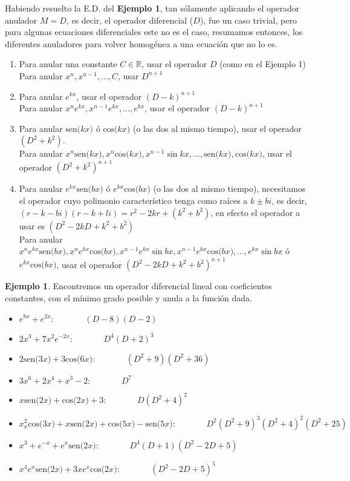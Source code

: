 \documentclass{article}
\newcommand{\eqtab}{\:\:\:\:\:\:\:\:\:\:\:\:\:\:\:\:}
\newcommand{\sen}[1]{\text{sen(} #1 \text{)}}
\renewcommand{\cos}[1]{\text{cos(} #1 \text{)}}
\theoremstyle{definition}
\newtheorem{ejemplo}[ejm]{Ejemplo}
\begin{document}
Habiendo resuelto la E.D. del \textbf{Ejemplo 1}, tan s\'{o}lamente aplicando el operador anulador $M = D$, es decir, el operador diferencial ($D$), fue un caso trivial, pero para algunas ecuaciones diferenciales este no es el caso, resumamos entonces, los diferentes anuladores para volver homog\'{e}nea a una ecuaci\'{o}n que no lo es.

\begin{enumerate}
\item Para anular una constante $C \in \mathbb{R}$, usar el operador $D$ (como en el Ejemplo 1)\\
	Para anular $x^n,x^{n-1}, \dots, C$, usar $D^{n+1}$
\item Para anular $e^{kx}$, usar el operador $(D - k)^{n+1}$\\
	Para anular $x^ne^{kx}, x^{n-1}e^{kx}, \dots, e^{kx}$, usar el operador $(D-k)^{n+1}$
\item Para anular  $\sen{kx}$ \'{o} $\cos{kx}$ (o las dos al mismo tiempo), usar el operador $(D^2 + k^2)$.\\
	Para anular $x^n\sen{kx},x^n\cos{kx},x^{n-1}\sin{kx},\dots,\sen{kx},\cos{kx}$, usar el operador $(D^2 + k^2)^{n+1}$
\item Para anular $e^{kx}\sen{bx}$ \'{o} $e^{kx}\cos{bx}$ (o las dos al mismo tiempo), necesitamos el operador cuyo polimonio caracter\'{i}stico tenga como ra\'{i}ces a $k \pm bi$, es decir, $(r - k - bi)(r - k + li) = r^2 - 2kr + (k^2 + b^2)$, en efecto el operador a usar es $(D^2 - 2kD + k^2 + b^2)$\\
	Para anular $x^ne^{kx}\sen{bx}, x^ne^{kx}\cos{bx},x^{n-1}e^{kx}\sin{bx}, x^{n-1}e^{kx}\cos{bx},\dots,e^{kx}\sin{bx}$ \'{o} $e^{kx}\cos{bx}$, usar el operador $(D^2 - 2kD + k^2 + b^2)^{n+1}$
\end{enumerate}

\begin{ejemplo}
Encontremos un operador diferencial lineal con coeficientes constantes, con el m\'{i}nimo grado posible y anula a la funci\'{o}n dada.

\begin{itemize}
\item $e^{8x} + e^{2x}: \eqtab (D-8)(D-2)$
\item $2x^3 + 7x^2e^{-2x}: \eqtab D^4(D+2)^3$ 
\item $2\sen{3x} + 3\cos{6x}: \eqtab (D^2+9)(D^2+36)$
\item $3x^6 + 2x^4 + x^3 - 2: \eqtab D^7$
\item $x\sen{2x} + \cos{2x} + 3: \eqtab D(D^2+4)^2$
\item $x_x^2\cos{3x}+x\sen{2x}+\cos{5x}-\sen{5x}: \eqtab D^2(D^2+9)^3(D^2+4)^2(D^2+25)$
\item $x^3+e^{-x} + e^x\sen{2x}: \eqtab	D^4(D+1)(D^2-2D+5)$
\item $x^4e^x\sen{2x}+3xe^x\cos{2x}: \eqtab (D^2-2D+5)^5$
\end{itemize}
\end{ejemplo}
\end{document}
